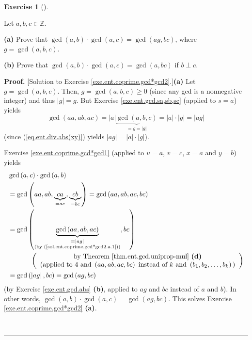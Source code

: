 \documentclass[numbers=enddot,12pt,final,onecolumn,notitlepage]{scrartcl}%
\newcounter{exer}
\numberwithin{exer}{subsection}
\theoremstyle{definition}
\newtheorem{exmp}[exer]{Exercise}
\newenvironment{exercise}[1][]
{\begin{exmp}[#1]\begin{leftbar}}
{\end{leftbar}\end{exmp}}
\newenvironment{proof}[1][Proof]{\noindent\textbf{#1.} }{\ \rule{0.5em}{0.5em}}
\begin{document}
\begin{exercise}
\label{exe.ent.coprime.gcd*gcd2}Let $a,b,c\in\mathbb{Z}$.

\textbf{(a)} Prove that $\gcd\left(  a,b\right)  \cdot\gcd\left(  a,c\right)
=\gcd\left(  ag,bc\right)  $, where $g=\gcd\left(  a,b,c\right)  $.

\textbf{(b)} Prove that $\gcd\left(  a,b\right)  \cdot\gcd\left(  a,c\right)
=\gcd\left(  a,bc\right)  $ if $b\perp c$.
\end{exercise}

\begin{proof}
[Solution to Exercise \ref{exe.ent.coprime.gcd*gcd2}.]\textbf{(a)} Let
$g=\gcd\left(  a,b,c\right)  $. Then, $g=\gcd\left(  a,b,c\right)  \geq0$
(since any gcd is a nonnegative integer) and thus $\left\vert g\right\vert
=g$. But Exercise \ref{exe.ent.gcd.sa,sb,sc} (applied to $s=a$) yields%
\begin{equation}
\gcd\left(  aa,ab,ac\right)  =\left\vert a\right\vert \underbrace{\gcd\left(
a,b,c\right)  }_{=g=\left\vert g\right\vert }=\left\vert a\right\vert
\cdot\left\vert g\right\vert =\left\vert ag\right\vert
\label{sol.ent.coprime.gcd*gcd2.a.1}%
\end{equation}
(since (\ref{eq.ent.div.abs(xy)}) yields $\left\vert ag\right\vert =\left\vert
a\right\vert \cdot\left\vert g\right\vert $).

Exercise \ref{exe.ent.coprime.gcd*gcd1} (applied to $u=a$, $v=c$, $x=a$ and
$y=b$) yields%
\begin{align*}
&  \gcd\left(  a,c\right)  \cdot\gcd\left(  a,b\right) \\
&  =\gcd\left(  aa,ab,\underbrace{ca}_{=ac},\underbrace{cb}_{=bc}\right)
=\gcd\left(  aa,ab,ac,bc\right) \\
&  =\gcd\left(  \underbrace{\gcd\left(  aa,ab,ac\right)  }%
_{\substack{=\left\vert ag\right\vert \\\text{(by
(\ref{sol.ent.coprime.gcd*gcd2.a.1}))}}},bc\right) \\
&  \ \ \ \ \ \ \ \ \ \ \left(
\begin{array}
[c]{c}%
\text{by Theorem \ref{thm.ent.gcd.uniprop-mul} \textbf{(d)}}\\
\text{(applied to }4\text{ and }\left(  aa,ab,ac,bc\right)  \text{ instead of
}k\text{ and }\left(  b_{1},b_{2},\ldots,b_{k}\right)  \text{)}%
\end{array}
\right) \\
&  =\gcd\left(  \left\vert ag\right\vert ,bc\right)  =\gcd\left(
ag,bc\right)
\end{align*}
(by Exercise \ref{exe.ent.gcd.abs} \textbf{(b)}, applied to $ag$ and $bc$
instead of $a$ and $b$). In other words, $\gcd\left(  a,b\right)  \cdot
\gcd\left(  a,c\right)  =\gcd\left(  ag,bc\right)  $. This solves Exercise
\ref{exe.ent.coprime.gcd*gcd2} \textbf{(a)}.


\end{proof}
\end{document}
